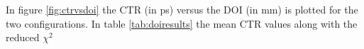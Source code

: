In figure \ref{fig:ctrvsdoi} the CTR (in ps) versus the DOI (in mm) is plotted for the two configurations. In table \ref{tab:doiresults} the mean CTR values along with the reduced $\chi^2$